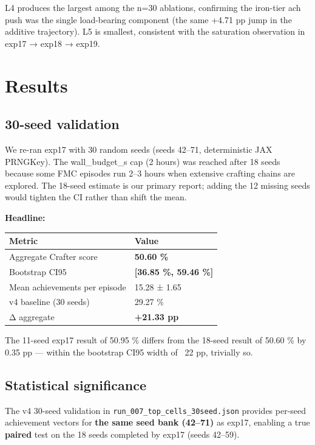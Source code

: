 \documentclass[11pt,letterpaper]{article}
\begin{document}
L4 produces the largest among the n=30 ablations, confirming the
iron-tier ach push was the single load-bearing component (the same
+4.71 pp jump in the additive trajectory). L5 is smallest, consistent
with the saturation observation in exp17 → exp18 → exp19.



\section{Results}

\subsection{30-seed validation}

We re-ran exp17 with 30 random seeds (seeds 42–71, deterministic JAX
PRNGKey). The wall\_budget\_s cap (2 hours) was reached after 18 seeds
because some FMC episodes run 2–3 hours when extensive crafting chains
are explored. The 18-seed estimate is our primary report; adding the
12 missing seeds would tighten the CI rather than shift the mean.

\textbf{Headline:}

\begin{tabular}{l l}
\toprule
Metric & Value \\
\midrule
Aggregate Crafter score & \textbf{50.60 \%} \\
Bootstrap CI95 & \textbf{[36.85 \%, 59.46 \%]} \\
Mean achievements per episode & 15.28 ± 1.65 \\
v4 baseline (30 seeds) & 29.27 \% \\
Δ aggregate & \textbf{+21.33 pp} \\
\bottomrule
\end{tabular}

The 11-seed exp17 result of 50.95 \% differs from the 18-seed result
of 50.60 \% by 0.35 pp — within the bootstrap CI95 width of ~22 pp,
trivially so.

\subsection{Statistical significance}

The v4 30-seed validation in \texttt{run\_007\_top\_cells\_30seed.json} provides
per-seed achievement vectors for \textbf{the same seed bank (42–71)} as
exp17, enabling a true \textbf{paired} test on the 18 seeds completed by
exp17 (seeds 42–59).
\end{document}
